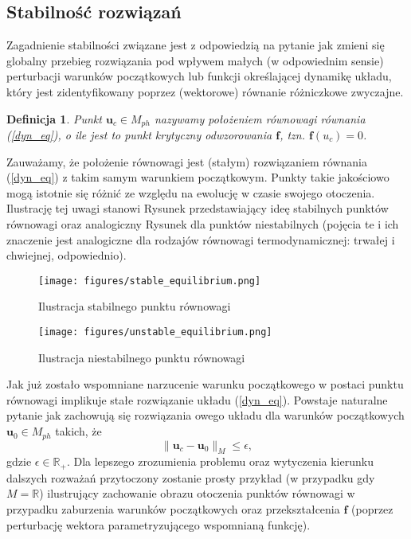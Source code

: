 \documentclass[12pt]{article}
\newtheorem{defi}{Definicja}
\begin{document}
\subsection{Stabilność rozwiązań}
Zagadnienie stabilności związane jest z odpowiedzią na pytanie jak zmieni się globalny przebieg rozwiązania pod wpływem małych (w odpowiednim sensie) perturbacji warunków początkowych lub funkcji określającej dynamikę układu, który jest zidentyfikowany poprzez (wektorowe) równanie różniczkowe zwyczajne.
\begin{defi}\label{crit_points}
	Punkt $ \textbf{u}_{c} \in M_{ph}$ nazywamy położeniem równowagi równania (\ref{dyn_eq}), o ile jest to punkt krytyczny odwzorowania $ \textbf{f} $, tzn. $ \textbf{f}(u_{c}) = 0 $.
\end{defi}
Zauważamy, że położenie równowagi jest (stałym) rozwiązaniem równania (\ref{dyn_eq}) z takim samym warunkiem początkowym. Punkty takie jakościowo mogą istotnie się różnić ze względu na ewolucję w czasie swojego otoczenia. Ilustrację tej uwagi stanowi Rysunek przedstawiający ideę stabilnych  punktów równowagi oraz analogiczny Rysunek dla punktów niestabilnych (pojęcia te i ich znaczenie jest analogiczne dla rodzajów równowagi termodynamicznej: trwałej i chwiejnej, odpowiednio).
\begin{figure}[H]
	\texttt{[image: figures/stable\_equilibrium.png]}
	\centering
	\caption{Ilustracja stabilnego punktu równowagi}
\end{figure}
\begin{figure}[H]
	\texttt{[image: figures/unstable\_equilibrium.png]} 
	\centering
	\caption{Ilustracja niestabilnego punktu równowagi}
\end{figure}
Jak już zostało wspomniane narzucenie warunku początkowego w postaci punktu równowagi implikuje stałe rozwiązanie układu (\ref{dyn_eq}). Powstaje naturalne pytanie jak zachowują się rozwiązania owego układu dla warunków początkowych  $ \textbf{u}_{0} \in M_{ph}$ takich, że
\begin{equation}
	\| \textbf{u}_{c} - \textbf{u}_{0} \|_{M}  \leq \epsilon,
\label{x_xc}
\end{equation}
gdzie $ \epsilon \in \mathbb{R}_{+} $.\newline
Dla lepszego zrozumienia problemu oraz wytyczenia kierunku dalszych rozważań przytoczony zostanie prosty przykład (w przypadku gdy $ M = \mathbb{R} $) ilustrujący zachowanie obrazu otoczenia punktów równowagi w przypadku zaburzenia warunków początkowych oraz przekształcenia $ \textbf{f} $ (poprzez perturbację wektora parametryzującego wspomnianą funkcję). \newline
\end{document}
